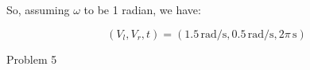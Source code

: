 \documentclass[answers]{exam}
\begin{document}
\begin{questions}
\begin{parts}
\begin{solution}
            So, assuming \(\omega\) to be 1 radian, we have:

            \[
                (V_l, V_r, t) = (1.5 \, \text{rad/s}, 0.5 \, \text{rad/s}, 2\pi \, \text{s})
            \]
        \end{solution}
    \end{parts}
    \question Problem 5

\end{questions}
\end{document}

